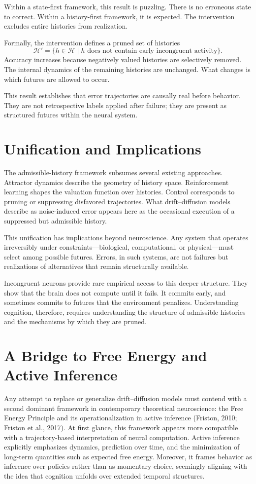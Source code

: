 \documentclass[11pt]{article}
\newcommand{\histories}{\mathcal{H}}
\begin{document}
Within a state-first framework, this result is puzzling. There is no erroneous state to correct. Within a history-first framework, it is expected. The intervention excludes entire histories from realization.

Formally, the intervention defines a pruned set of histories
\[
\histories' = \{ h \in \histories \mid h \text{ does not contain early incongruent activity} \}.
\]
Accuracy increases because negatively valued histories are selectively removed. The internal dynamics of the remaining histories are unchanged. What changes is which futures are allowed to occur.

This result establishes that error trajectories are causally real before behavior. They are not retrospective labels applied after failure; they are present as structured futures within the neural system.

\section{Unification and Implications}

The admissible-history framework subsumes several existing approaches. Attractor dynamics describe the geometry of history space. Reinforcement learning shapes the valuation function over histories. Control corresponds to pruning or suppressing disfavored trajectories. What drift–diffusion models describe as noise-induced error appears here as the occasional execution of a suppressed but admissible history.

This unification has implications beyond neuroscience. Any system that operates irreversibly under constraints—biological, computational, or physical—must select among possible futures. Errors, in such systems, are not failures but realizations of alternatives that remain structurally available.

Incongruent neurons provide rare empirical access to this deeper structure. They show that the brain does not compute until it fails. It commits early, and sometimes commits to futures that the environment penalizes. Understanding cognition, therefore, requires understanding the structure of admissible histories and the mechanisms by which they are pruned.

\section{A Bridge to Free Energy and Active Inference}

Any attempt to replace or generalize drift–diffusion models must contend with a second dominant framework in contemporary theoretical neuroscience: the Free Energy Principle and its operationalization in active inference (Friston, 2010; Friston et al., 2017). At first glance, this framework appears more compatible with a trajectory-based interpretation of neural computation. Active inference explicitly emphasizes dynamics, prediction over time, and the minimization of long-term quantities such as expected free energy. Moreover, it frames behavior as inference over policies rather than as momentary choice, seemingly aligning with the idea that cognition unfolds over extended temporal structures.
\end{document}
